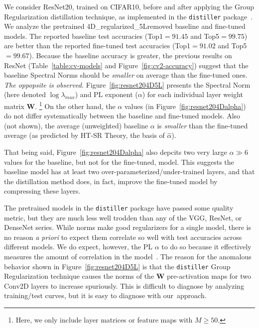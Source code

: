 We consider ResNet20, trained on CIFAR10, before and after applying the Group Regularization distillation technique, as implemented in the \texttt{distiller} package~\cite{distiller}.
We analyze the pretrained 4D\_regularized\_5Lremoved baseline and fine-tuned models. 
The reported baseline test accuracies (Top1$=91.45$ and Top5$=99.75$) are better than the reported fine-tuned test accuracies (Top1$=91.02$ and Top5$=99.67$).  Because the baseline accuracy is greater,  the previous results on ResNet (Table~\ref{table:cv-models} and Figure~\ref{fig:cv2-accuracy}) suggest that the baseline Spectral Norms should be \emph{smaller} on average than the fine-tuned ones. \emph{The oppopsite is observed.}
Figure~\ref{fig:resnet204D5L} presents the Spectral Norm (here denoted $\log\lambda_{max}$) and PL exponent ($\alpha$) for each individual layer weight matrix $\mathbf{W}$.%
\footnote{Here, we only include layer matrices or feature maps with $M\ge50$.}
On the other hand, the $\alpha$ values (in Figure~\ref{fig:resnet204Dalpha}) do not differ systematically between the baseline and fine-tuned models.
Also (not shown), the average (unweighted) baseline $\alpha$ is \emph{smaller} than the fine-tuned average (as predicted by HT-SR Theory, the basis of $\hat{\alpha}$).

That being said, Figure~\ref{fig:resnet204Dalpha} also depcits two very large $\alpha\gg 6$ values for the baseline, but not for the fine-tuned, model.
This suggests the baseline model has at least two over-parameterized/under-trained layers, and that the distillation method does, in fact, improve the fine-tuned model by compressing these layers.

The pretrained models in the \texttt{distiller} package have passed some quality metric, but they are much less well trodden than any of the 
VGG, ResNet, or DenseNet series.  %
While norms make good regularizers for a single model, there is no reason \emph{a priori} to expect them correlate so well with test accuracies across different models.
We do expect, however, the PL $\alpha$ to do so because it effectively measures the amount of correlation in the model~\cite{MM18_TR, MM19_HTSR_ICML, MM20_SDM}.
The reason for the anomalous behavior shown in 
Figure~\ref{fig:resnet204D5L}
is that the \texttt{distiller} Group Regularization technique 
causes the norms of the $\mathbf{W}$ pre-activation maps for two Conv2D layers to increase spuriously.
This is difficult to diagnose by analyzing training/test curves, but it is easy to diagnose with our~approach.


